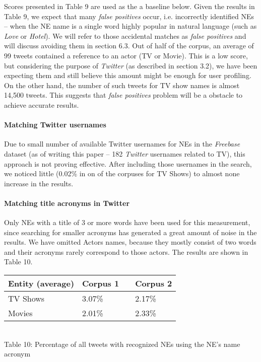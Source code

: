 Scores presented in Table 9 are used as the a baseline below. Given the results in Table 9, we expect that
many \textit{false positives} occur, i.e. incorrectly identified NEs -- when the NE name is a single
word highly popular in natural language (such as \textit{Love} or \textit{Hotel}). We will refer to those accidental
matches as \textit{false positives} and will discuss avoiding them in section 6.3. Out of half of the corpus, an
average of 99 tweets contained a reference to an actor (TV or Movie). This is a low score, but considering the
purpose of \textit{Twitter} (as described in section 3.2), we have been expecting them and still believe this amount
might be enough for user profiling. On the other hand, the number of such tweets for TV show names is almost 14,500
tweets. This suggests that \textit{false positives} problem will be a obstacle to achieve accurate results.

\paragraph{Matching Twitter usernames}
Due to small number of available Twitter usernames for NEs in the \textit{Freebase} dataset (as of writing this
paper -- 182 \textit{Twitter} usernames related to TV), this approach is not proving effective. After including those
usernames in the search, we noticed little (0.02\% in on of the corpuses for TV Shows) to almost none increase in
the results.

\paragraph{Matching title acronyms in Twitter}
Only NEs with a title of 3 or more words have been used for this measurement, since searching
for smaller acronyms has generated a great amount of noise in the results. We have omitted Actors names, because
they mostly consist of two words and their acronyms rarely correspond to those actors. The results
are shown in Table 10.

\begin{center}
  \begin{tabular}{ | p{4cm} | p{2cm} | p{1cm}| p{2cm} | } \hline
    Entity (average) & Corpus 1 & & Corpus 2 \\ \hline
    TV Shows & 3.07\% & & 2.17\% \\ \hline
    Movies & 2.01\% & & 2.33\% \\ \hline
  \end{tabular} \\
  Table 10: Percentage of all tweets with recognized NEs using the NE's name acronym \\
\end{center}

